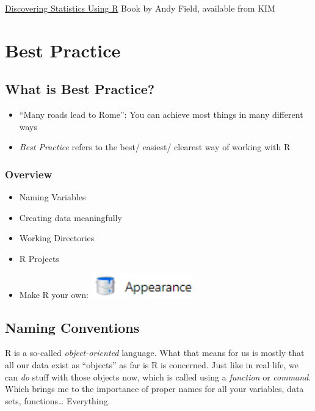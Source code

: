 \documentclass[
]{book}
\providecommand{\tightlist}{%
  \setlength{\itemsep}{0pt}\setlength{\parskip}{0pt}}
\begin{document}
\href{https://katalog.uni-konstanz.de/libero/WebOpac.cls?VERSION=2&ACTION=DISPLAY&RSN=2222774&DATA=KON&TOKEN=nGIfSiZsIA5826&Z=1&SET=1}{Discovering Statistics Using R} Book by Andy Field, available from KIM

\chapter{Best Practice}\label{best-practice}

\section{What is Best Practice?}\label{what-is-best-practice}

\begin{itemize}
\tightlist
\item
  ``Many roads lead to Rome'': You can achieve most things in many different ways
\item
  \emph{Best Practice} refers to the best/ easiest/ clearest way of working with R
\end{itemize}

\subsection{Overview}\label{overview}

\begin{itemize}
\tightlist
\item
  Naming Variables
\item
  Creating data meaningfully
\item
  Working Directories
\item
  R Projects
\item
  Make R your own: \includegraphics[width=\textwidth,height=0.41667in]{./img/appearance.png}
\end{itemize}

\section{Naming Conventions}\label{naming-conventions}

R is a so-called \emph{object-oriented} language.
What that means for us is mostly that all our data exist as ``objects'' as far is R is concerned.
Just like in real life, we can \emph{do} stuff with those objects now, which is called using a \emph{function} or \emph{command}.
Which brings me to the importance of proper names for all your variables, data sets, functions\ldots{}
Everything.
\end{document}
